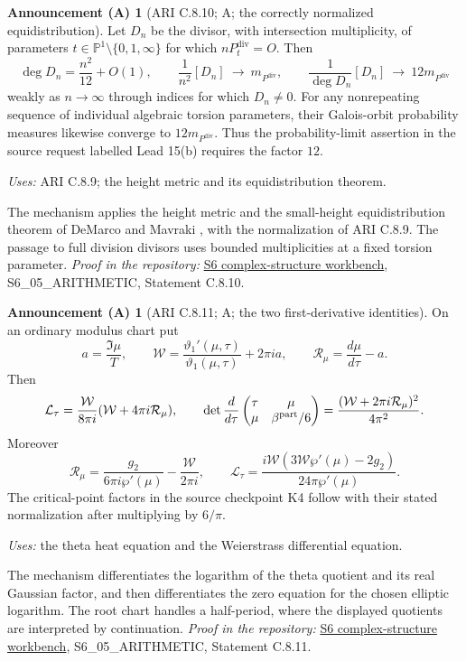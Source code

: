 \documentclass[11pt,a4paper]{article}
\theoremstyle{plain}
\theoremstyle{definition}
\newtheorem{announcement}[theorem]{Announcement (A)}
\begin{document}
\begin{announcement}[ARI C.8.10; A; the correctly normalized equidistribution]\label{ari:C.8.10}
Let $D_n$ be the divisor, with intersection multiplicity, of
parameters $t\in\mathbb{P}^1\setminus\{0,1,\infty\}$ for which
$nP^{\mathrm{div}}_t=O$. Then
\[
 \deg D_n=\frac{n^2}{12}+O(1),\qquad
 \frac1{n^2}[D_n]\ \longrightarrow\ m_{P^{\mathrm{div}}},\qquad
 \frac1{\deg D_n}[D_n]\ \longrightarrow\ 12m_{P^{\mathrm{div}}}
\]
weakly as $n\to\infty$ through indices for which $D_n\ne0$.
For any nonrepeating sequence of individual algebraic torsion
parameters, their Galois-orbit probability measures likewise
converge to $12m_{P^{\mathrm{div}}}$. Thus the probability-limit assertion
in the source request labelled Lead 15(b) requires the factor $12$.
\end{announcement}
\noindent\textit{Uses:} ARI C.8.9; the height metric and its equidistribution theorem.\par
The mechanism applies the height metric and the small-height equidistribution theorem of DeMarco and Mavraki \cite[Theorem~1.1 and Corollary~1.2]{DM20}, with the normalization of ARI C.8.9. The passage to full division divisors uses bounded multiplicities at a fixed torsion parameter.
\noindent\textit{Proof in the repository:} \href{https://github.com/KokunoYumeto/s6-complex-structure-workbench}{S6 complex-structure workbench}, S6\_05\_ARITHMETIC, Statement C.8.10.

\begin{announcement}[ARI C.8.11; A; the two first-derivative identities]\label{ari:C.8.11}
On an ordinary modulus chart put
\[
 a=\frac{\Im\mu}{T},\qquad
 \mathcal W=\frac{\vartheta_1'(\mu,\tau)}{\vartheta_1(\mu,\tau)}
                         +2\pi ia,\qquad
 \mathcal R_\mu=\frac{d\mu}{d\tau}-a.
\]
Then
\[
 \mathcal L_\tau=\frac{\mathcal W}{8\pi i}(\mathcal W+4\pi i\mathcal R_\mu),\qquad
 \det\frac{d}{d\tau}
 \begin{pmatrix}\tau&\mu\\\mu&\beta^{\rm part}/6\end{pmatrix}
       =\frac{(\mathcal W+2\pi i\mathcal R_\mu)^2}{4\pi^2}.
\]
Moreover
\[
 \mathcal R_\mu=\frac{g_2}{6\pi i\wp'(\mu)}-\frac{\mathcal W}{2\pi i},
 \qquad
 \mathcal L_\tau=\frac{i\mathcal W(3\mathcal W\wp'(\mu)-2g_2)}
                         {24\pi\wp'(\mu)}.
\]
The critical-point factors in the source checkpoint K4 follow with their stated
normalization after multiplying by $6/\pi$.
\end{announcement}
\noindent\textit{Uses:} the theta heat equation and the Weierstrass differential equation.\par
The mechanism differentiates the logarithm of the theta quotient and its real Gaussian factor, and then differentiates the zero equation for the chosen elliptic logarithm. The root chart handles a half-period, where the displayed quotients are interpreted by continuation.
\noindent\textit{Proof in the repository:} \href{https://github.com/KokunoYumeto/s6-complex-structure-workbench}{S6 complex-structure workbench}, S6\_05\_ARITHMETIC, Statement C.8.11.
\end{document}

